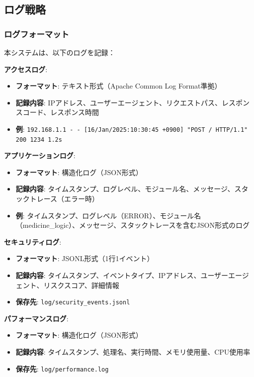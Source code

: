 \documentclass[a4paper,11pt,ja=standard,xelatex]{bxjsarticle}
\theoremstyle{definition}
\begin{document}
\subsection{ログ戦略}

\subsubsection{ログフォーマット}

本システムは、以下のログを記録：

\textbf{アクセスログ}:
\begin{itemize}
\item \textbf{フォーマット}: テキスト形式（Apache Common Log Format準拠）
\item \textbf{記録内容}: IPアドレス、ユーザーエージェント、リクエストパス、レスポンスコード、レスポンス時間
\item \textbf{例}: \texttt{192.168.1.1 - - [16/Jan/2025:10:30:45 +0900] "POST / HTTP/1.1" 200 1234 1.2s}
\end{itemize}

\textbf{アプリケーションログ}:
\begin{itemize}
\item \textbf{フォーマット}: 構造化ログ（JSON形式）
\item \textbf{記録内容}: タイムスタンプ、ログレベル、モジュール名、メッセージ、スタックトレース（エラー時）
\item \textbf{例}: タイムスタンプ、ログレベル（ERROR）、モジュール名（medicine\_logic）、メッセージ、スタックトレースを含むJSON形式のログ
\end{itemize}

\textbf{セキュリティログ}:
\begin{itemize}
\item \textbf{フォーマット}: JSONL形式（1行1イベント）
\item \textbf{記録内容}: タイムスタンプ、イベントタイプ、IPアドレス、ユーザーエージェント、リスクスコア、詳細情報
\item \textbf{保存先}: \texttt{log/security\_events.jsonl}
\end{itemize}

\textbf{パフォーマンスログ}:
\begin{itemize}
\item \textbf{フォーマット}: 構造化ログ（JSON形式）
\item \textbf{記録内容}: タイムスタンプ、処理名、実行時間、メモリ使用量、CPU使用率
\item \textbf{保存先}: \texttt{log/performance.log}
\end{itemize}
\end{document}
